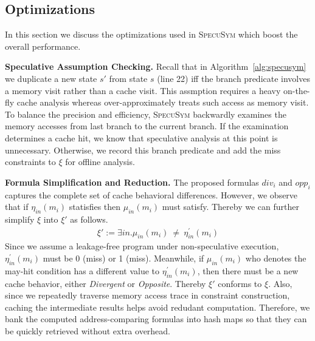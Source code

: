 \documentclass[sigconf, review]{acmart}
\newcommand{\SpecuSym}{\textsc{SpecuSym} }
\begin{document}
\subsection{Optimizations}
\label{sec:optimize}

In this section we discuss the optimizations used in \SpecuSym which boost 
the overall performance.

\textbf{Speculative Assumption Checking.}
Recall that in Algorithm~\ref{alg:specusym} we duplicate a new state $s'$ 
from state $s$ (line 22) iff the branch predicate involves a memory visit 
rather than a cache visit. This assmption requires a heavy on-the-fly cache 
analysis whereas \cite{WuW19} over-approximately treats such access as  
memory visit. To balance the precision and efficiency, \SpecuSym backwardly
examines the memory accesses from last branch to the current branch. If the 
examination determines a cache hit, we know that speculative analysis at this 
point is unnecessary. Otherwise, we record this branch predicate and add the 
miss constraints to $\xi$ for offline analysis.  


\textbf{Formula Simplification and Reduction.}
The proposed formulas $\mathit{div_i}$ and $\mathit{opp_i}$ captures the 
complete set of cache behavioral differences. However, we observe that if 
$\mathit{\eta_{in}(m_i)}$ statisfies then $\mathit{\mu_{in}(m_i)}$ must 
satisfy. Thereby we can further simplify $\xi$ into $\xi'$ as follows.  
%
\begin{multline}
  \label{eqn:leak}
  ~~~~~~~~~~~~~~~
  \xi':=
  \exists\mathit{in}.
  \mathit{
    \mu_{in}(m_i)~\neq~\eta_{in}^\prime(m_i)
  }
  ~~~~~~~~~~~~~~~
\end{multline}
%
Since we assume a leakage-free program under non-speculative execution, 
$\mathit{\eta_{in}^\prime(m_i)}$ must be 0 (miss) or 1 (miss). Meanwhile, 
if $\mathit{\mu_{in}(m_i)}$ who denotes the may-hit condition has a 
different value to $\mathit{\eta_{in}^\prime(m_i)}$, then there must be 
a new cache behavior, either \textit{Divergent} or \textit{Opposite}. 
Thereby $\xi'$ conforms to $\xi$. Also, since we repeatedly traverse 
memory access trace in constraint construction, caching the intermediate 
results helps avoid redudant computation. Therefore, we bank the computed 
address-comparing formulas into hash maps so that they can be quickly 
retrieved without extra overhead. 
\end{document}
